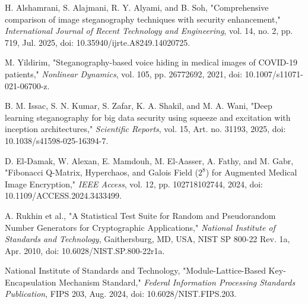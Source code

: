 \begin{LTR}
\begin{list}{}{\setlength{\leftmargin}{10mm}\setlength{\labelwidth}{8mm}\setlength{\itemsep}{8pt}}
\item[\lr{[8]}]\hypertarget{ref-8}{} H. Alshamrani, S. Alajmani, R. Y. Alyami, and B. Soh, "Comprehensive comparison of image steganography techniques with security enhancement," \textit{International Journal of Recent Technology and Engineering}, vol. 14, no. 2, pp. 719, Jul. 2025, doi: 10.35940/ijrte.A8249.14020725.
\item[\lr{[9]}]\hypertarget{ref-9}{} M. Yildirim, "Steganography{-}based voice hiding in medical images of COVID{-}19 patients," \textit{Nonlinear Dynamics}, vol. 105, pp. 26772692, 2021, doi: 10.1007/s11071{-}021{-}06700{-}z.
\item[\lr{[10]}]\hypertarget{ref-10}{} B. M. Issac, S. N. Kumar, S. Zafar, K. A. Shakil, and M. A. Wani, "Deep learning steganography for big data security using squeeze and excitation with inception architectures," \textit{Scientific Reports}, vol. 15, Art. no. 31193, 2025, doi: 10.1038/s41598{-}025{-}16394{-}7.
\item[\lr{[11]}]\hypertarget{ref-11}{} D. El{-}Damak, W. Alexan, E. Mamdouh, M. El{-}Aasser, A. Fathy, and M. Gabr, "Fibonacci Q{-}Matrix, Hyperchaos, and Galois Field ($2^8$) for Augmented Medical Image Encryption," \textit{IEEE Access}, vol. 12, pp. 102718102744, 2024, doi: 10.1109/ACCESS.2024.3433499.
\item[\lr{[12]}]\hypertarget{ref-12}{} A. Rukhin et al., "A Statistical Test Suite for Random and Pseudorandom Number Generators for Cryptographic Applications," \textit{National Institute of Standards and Technology}, Gaithersburg, MD, USA, NIST SP 800{-}22 Rev. 1a, Apr. 2010, doi: 10.6028/NIST.SP.800{-}22r1a.
\item[\lr{[13]}]\hypertarget{ref-13}{} National Institute of Standards and Technology, "Module{-}Lattice{-}Based Key{-}Encapsulation Mechanism Standard," \textit{Federal Information Processing Standards Publication}, FIPS 203, Aug. 2024, doi: 10.6028/NIST.FIPS.203.
\end{list}
\end{LTR}